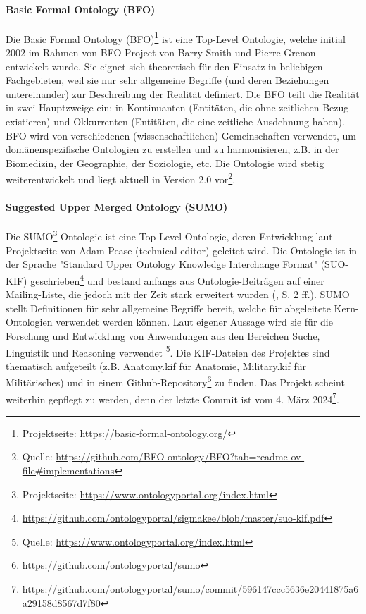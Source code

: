\documentclass{article}
\begin{document}
\paragraph{Basic Formal Ontology (BFO)} Die Basic Formal Ontology (BFO)\footnote{Projektseite: \url{https://basic-formal-ontology.org/}} ist eine Top-Level Ontologie, welche initial 2002 im Rahmen von BFO Project von Barry Smith und Pierre Grenon entwickelt wurde.
Sie eignet sich theoretisch für den Einsatz in beliebigen Fachgebieten, weil sie nur sehr allgemeine Begriffe (und deren Beziehungen untereinander) zur Beschreibung der Realität definiert.
Die BFO teilt die Realität in zwei Hauptzweige ein: in Kontinuanten (Entitäten, die ohne zeitlichen Bezug existieren) und Okkurrenten (Entitäten, die eine zeitliche Ausdehnung haben).
BFO wird von verschiedenen (wissenschaftlichen) Gemeinschaften verwendet, um domänenspezifische Ontologien zu erstellen und zu harmonisieren, z.B. in der Biomedizin, der Geographie, der Soziologie, etc.
Die Ontologie wird stetig weiterentwickelt und liegt aktuell in Version 2.0 vor\footnote{Quelle: \url{https://github.com/BFO-ontology/BFO?tab=readme-ov-file\#implementations}}.

\paragraph{Suggested Upper Merged Ontology (SUMO)}

Die SUMO\footnote{Projektseite: \url{https://www.ontologyportal.org/index.html}} Ontologie ist eine Top-Level Ontologie, deren Entwicklung laut Projektseite von Adam Pease (technical editor) geleitet wird.
Die Ontologie ist in der Sprache "Standard Upper Ontology Knowledge Interchange Format" (SUO-KIF) geschrieben\footnote{\url{https://github.com/ontologyportal/sigmakee/blob/master/suo-kif.pdf}} und bestand anfangs aus Ontologie-Beiträgen auf einer Mailing-Liste, die jedoch mit der Zeit stark erweitert wurden (\cite{niles2001towards}, S. 2 ff.).
SUMO stellt Definitionen für sehr allgemeine Begriffe bereit, welche für abgeleitete Kern-Ontologien verwendet werden können.
Laut eigener Aussage wird sie für die Forschung und Entwicklung von Anwendungen aus den Bereichen Suche, Linguistik und Reasoning verwendet \footnote{Quelle: \url{https://www.ontologyportal.org/index.html}}.
Die KIF-Dateien des Projektes sind thematisch aufgeteilt (z.B. Anatomy.kif für Anatomie, Military.kif für Militärisches) und in einem Github-Repository\footnote{\url{https://github.com/ontologyportal/sumo}} zu finden.
Das Projekt scheint weiterhin gepflegt zu werden, denn der letzte Commit ist vom 4. März 2024\footnote{\url{https://github.com/ontologyportal/sumo/commit/596147ccc5636e20441875a6a29158d8567d7f80}}.
\end{document}
